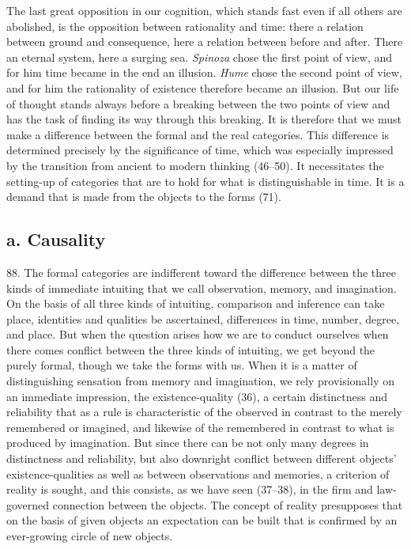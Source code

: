 \documentclass[12pt,a4paper]{book}
\newcommand{\opage}[1]{\marginnote{\footnotesize\textit{[#1]}}}
\begin{document}
The last great opposition in our cognition, which stands fast even if all
others are abolished, is the opposition between rationality and time: there a
relation between ground and consequence, here a relation between before and
after. There an eternal system, here a surging sea. \emph{Spinoza} chose the
first point of view, and for him time became in the end an illusion.
\emph{Hume} chose the second point of view, and for him the rationality of
existence therefore became an illusion. But our life of thought stands always
before a breaking between the two points of view and has the task of finding
its way through this breaking. It is \opage{208}therefore that we must make a difference
between the formal and the real categories. This difference is determined
precisely by the significance of time, which was especially impressed by the
transition from ancient to modern thinking (46--50). It necessitates the
setting-up of categories that are to hold for what is distinguishable in time.
It is a demand that is made from the objects to the forms (71).

\subsection*{a. Causality}

88. The formal categories are indifferent toward the difference between the
three kinds of immediate intuiting that we call observation, memory, and
imagination. On the basis of all three kinds of intuiting, comparison and
inference can take place, identities and qualities be ascertained,
differences in time, number, degree, and place. But when the question arises
how we are to conduct ourselves when there comes conflict between the three
kinds of intuiting, we get beyond the purely formal, though we take the forms
with us. When it is a matter of distinguishing sensation from memory and
imagination, we rely provisionally on an immediate impression, the
existence-quality (36), a certain distinctness and reliability that as a rule
is characteristic of the observed in contrast to the merely remembered or
imagined, and likewise of the remembered in contrast to what is produced by
imagination. But since there can be not only many degrees in distinctness and
reliability, but also downright conflict between different objects'
existence-qualities as well as between observations and memories, a criterion
of reality is sought, and this consists, as we have seen (37--38), in the
firm and law-governed connection between the objects. The concept of reality
presupposes that on the basis of given objects an expectation can be built
that is confirmed by an ever-growing circle of new objects.
\end{document}
